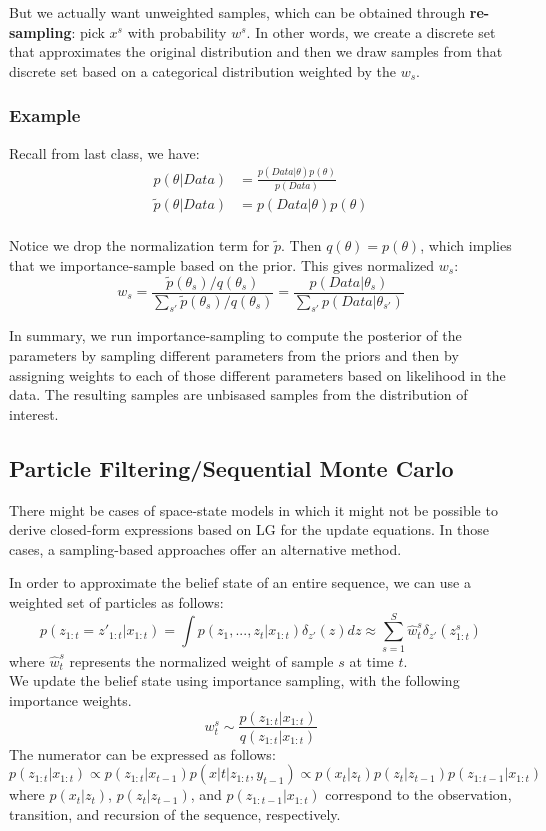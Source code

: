 \documentclass{article}
\begin{document}
But we actually want unweighted samples, which can be obtained through \textbf{re-sampling}: pick $x^s$ with probability $w^s$. In other words, we create a discrete set that approximates the original distribution and then we draw samples from that discrete set based on a categorical distribution weighted by the $w_s$. 

\subsubsection{Example} Recall from last class, we have:
\begin{align*}
    p(\theta | Data) &= \frac{p(Data|\theta)p(\theta)}{p(Data)} \\
    \tilde{p}(\theta | Data) &= p(Data|\theta)p(\theta) \\
\end{align*}

Notice we drop the normalization term for $\tilde{p}$. Then $q(\theta) = p(\theta)$, which implies that we importance-sample based on the prior. This gives normalized $w_s$:
\[
w_s = \frac{\tilde{p}(\theta_s)/{q}(\theta_s)}{\sum_{s'} \tilde{p}(\theta_s)/{q}(\theta_s)} =\frac{p(Data| \theta_s)}{\sum_{s'} p(Data|\theta_{s'}) }
\]

In summary, we run importance-sampling to compute the posterior of the parameters by sampling different parameters from the priors and then by assigning weights to each of those different parameters based on likelihood in the data. The resulting samples are unbisased samples from the distribution of interest. 


\subsection{Particle Filtering/Sequential Monte Carlo}
There might be cases of space-state models in which it might not be possible to derive closed-form expressions based on LG for the update equations. In those cases, a sampling-based approaches offer an alternative method. 

In order to approximate the belief state of an entire sequence, we can use a weighted set of particles as follows:  
\[p(z_{1:t}=z'_{1:t}|x_{1:t}) = \int p(z_1,...,z_t|x_{1:t})\delta_{z'}(z)dz \approx \sum_{s=1}^S \hat{w}_t^s \delta_{z'}(z^s_{1:t})\]
where $\hat{w}_t^s$ represents the normalized weight of sample $s$ at time $t$. \\

We update the belief state using importance sampling, with the following importance weights. 
\[w_t^s \sim \frac{p(z_{1:t}|x_{1:t})}{q(z_{1:t}|x_{1:t})}\]
The numerator can be expressed as follows: 
\[p(z_{1:t}|x_{1:t}) \propto p(z_{1:t}|x_{t-1})p(x|t|z_{1:t},y_{t-1}) \propto p(x_t|z_t)p(z_t|z_{t-1})p(z_{1:t-1}|x_{1:t})\]
where $p(x_t|z_t)$, $p(z_t|z_{t-1})$, and $p(z_{1:t-1}|x_{1:t})$ correspond to the observation, transition, and recursion of the sequence, respectively. \\
\end{document}
